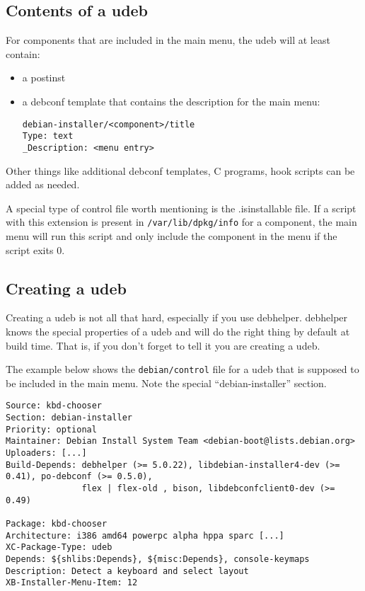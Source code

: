 \documentclass[a4paper,10pt]{article}
\begin{document}
\subsection{Contents of a udeb}
For components that are included in the main menu, the udeb will at least contain: 

\begin{itemize}
\item a postinst 
\item a debconf template that contains the description for the main menu:
  \begin{verbatim}
debian-installer/<component>/title
Type: text
_Description: <menu entry>
  \end{verbatim}
\end{itemize}

Other things like additional debconf templates, C programs, hook scripts can be added as needed. 

A special type of control file worth mentioning is the .isinstallable file. If a script with this extension is present in \texttt{/var/lib/dpkg/info} for a component, the main menu will run this script and only include the component in the menu if the script exits 0. 


\subsection{Creating a udeb}
Creating a udeb is not all that hard, especially if you use debhelper. debhelper knows the special properties of a udeb and will do the right thing by default at build time. That is, if you don't forget to tell it you are creating a udeb. 

The example below shows the \texttt{debian/control} file for a udeb that is supposed to be included in the main menu. Note the special “debian-installer” section.

\begin{verbatim}
Source: kbd-chooser
Section: debian-installer
Priority: optional
Maintainer: Debian Install System Team <debian-boot@lists.debian.org>
Uploaders: [...]
Build-Depends: debhelper (>= 5.0.22), libdebian-installer4-dev (>= 0.41), po-debconf (>= 0.5.0),
               flex | flex-old , bison, libdebconfclient0-dev (>= 0.49)

Package: kbd-chooser
Architecture: i386 amd64 powerpc alpha hppa sparc [...]
XC-Package-Type: udeb
Depends: ${shlibs:Depends}, ${misc:Depends}, console-keymaps
Description: Detect a keyboard and select layout
XB-Installer-Menu-Item: 12
\end{verbatim}
\end{document}
